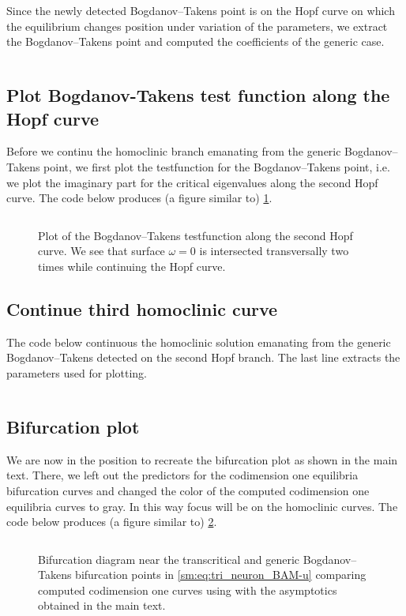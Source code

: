 Since the newly detected Bogdanov--Takens point is on the Hopf curve
on which the equilibrium changes position under variation of the
parameters, we extract the Bogdanov--Takens point and computed the coefficients
of the generic case.
\inputminted[firstline=179, lastline=181]{MATLAB}{\pathToDDEBifToolDemos/BAM_neural_network_model/BAMnn.m}

\subsection{Plot Bogdanov-Takens test function along the Hopf curve}
Before we continu the homoclinic branch emanating from the generic
Bogdanov--Takens point, we first plot the testfunction for the Bogdanov--Takens
point, i.e. we plot the imaginary part for the critical eigenvalues along the
second Hopf curve. The code below produces (a figure similar to)
\cref{sm:fig:triNeuronBAMNeuralNetworkModelTestfunction}.
\inputminted[firstline=185, lastline=197]{MATLAB}{\pathToDDEBifToolDemos/BAM_neural_network_model/BAMnn.m}
%
\begin{figure}[ht]
    \centering
    \caption{Plot of the Bogdanov--Takens testfunction along the second Hopf curve. 
    We see that surface $\omega=0$ is intersected transversally two times
    while continuing the Hopf curve.}
    \label{sm:fig:triNeuronBAMNeuralNetworkModelTestfunction}
\end{figure}

\subsection{Continue third homoclinic curve}
The code below continuous the homoclinic solution emanating from the generic Bogdanov--Takens detected
on the second Hopf branch. The last line extracts the parameters used for plotting.
\inputminted[firstline=199, lastline=205]{MATLAB}{\pathToDDEBifToolDemos/BAM_neural_network_model/BAMnn.m}

\subsection{Bifurcation plot}
We are now in the position to recreate the bifurcation plot as shown in the main text. There, we
left out the predictors for the codimension one equilibria bifurcation curves and changed the color
of the computed codimension one equilibria curves to gray. In this way focus will be on
the homoclinic curves. The code below produces (a figure similar to)
\cref{sm:fig:triNeuronBAMNeuralNetworkModelCompareParameters}.
\inputminted[firstline=213, lastline=243]{MATLAB}{\pathToDDEBifToolDemos/BAM_neural_network_model/BAMnn.m}
\begin{figure}[ht]
    \caption{
    Bifurcation diagram near the transcritical and generic Bogdanov--Takens
    bifurcation points in \cref{sm:eq:tri_neuron_BAM-u} comparing computed
    codimension one curves using \DDEBIFTOOL with the asymptotics obtained in the 
    main text.}
    \label{sm:fig:triNeuronBAMNeuralNetworkModelCompareParameters}
\end{figure}

